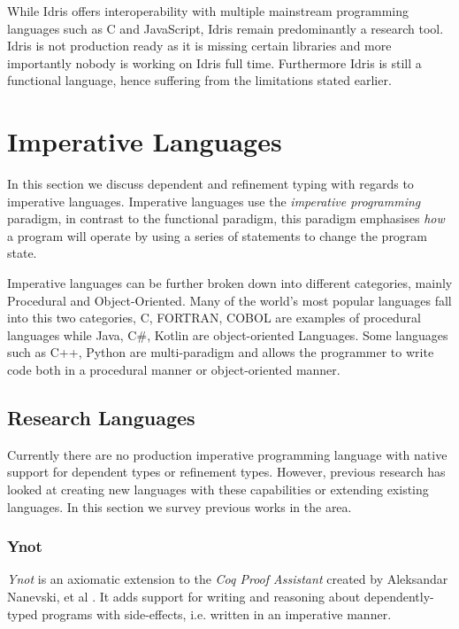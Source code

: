 \documentclass[a4paper,12pt]{report}
\begin{document}
\par
While Idris offers interoperability with multiple mainstream programming 
languages such as C and JavaScript, Idris remain predominantly a research tool. 
Idris is not production ready \cite{gpIdris} as it is missing certain libraries 
and more importantly nobody is working on Idris full time. Furthermore Idris is 
still a functional language, hence suffering from the limitations stated earlier. 

\section{Imperative Languages}
In this section we discuss dependent and refinement typing with regards to imperative 
languages. Imperative languages use the \textit{imperative programming} 
\cite{imperativeOverview} paradigm, in contrast to the functional 
paradigm, this paradigm emphasises \textit{how} a program will operate 
by using a series of statements to change the program state.

\par
Imperative languages can be further broken down into different categories, 
mainly Procedural and Object-Oriented. Many of the world's most popular languages 
fall into this two categories, C, FORTRAN, COBOL are examples of procedural 
languages while Java, C\#, Kotlin are object-oriented Languages. Some languages such 
as C++, Python are multi-paradigm and allows the programmer to write code both 
in a procedural manner or object-oriented manner. 

\subsection{Research Languages}
Currently there are no production imperative programming language with 
native support for dependent types or refinement types. 
However, previous research has looked at creating new languages with these 
capabilities or extending existing languages. In this section we survey 
previous works in the area. 

\subsubsection{Ynot} \label{section:ynot}
\textit{Ynot} is an axiomatic extension to the \textit{Coq Proof Assistant} 
\cite{coq} created by Aleksandar Nanevski, et al \cite{ynot}. It adds 
support for writing and reasoning about dependently-typed 
programs with side-effects, i.e. written in an imperative manner. 
\end{document}
